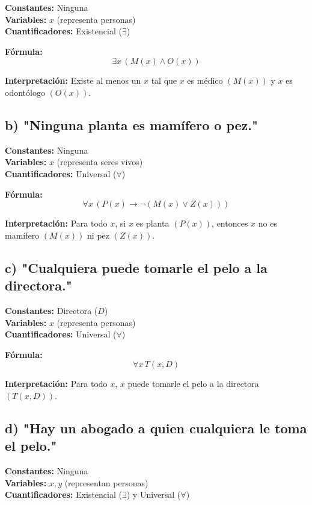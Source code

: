 \documentclass[11pt,letterpaper]{article}
\begin{document}
\textbf{Constantes:} Ninguna \\
\textbf{Variables:} \( x \) (representa personas) \\
\textbf{Cuantificadores:} Existencial (\( \exists \))

\textbf{Fórmula:}
\[
\exists x \, (M(x) \land O(x))
\]

\textbf{Interpretación:} Existe al menos un \( x \) tal que \( x \) es médico \( (M(x)) \) y \( x \) es odontólogo \( (O(x)) \).

\subsection*{b) "Ninguna planta es mamífero o pez."}

\textbf{Constantes:} Ninguna \\
\textbf{Variables:} \( x \) (representa seres vivos) \\
\textbf{Cuantificadores:} Universal (\( \forall \))

\textbf{Fórmula:}
\[
\forall x \, (P(x) \rightarrow \neg (M(x) \lor Z(x)))
\]

\textbf{Interpretación:} Para todo \( x \), si \( x \) es planta \( (P(x)) \), entonces \( x \) no es mamífero \( (M(x)) \) ni pez \( (Z(x)) \).

\subsection*{c) "Cualquiera puede tomarle el pelo a la directora."}

\textbf{Constantes:} Directora (\( D \)) \\
\textbf{Variables:} \( x \) (representa personas) \\
\textbf{Cuantificadores:} Universal (\( \forall \))

\textbf{Fórmula:}
\[
\forall x \, T(x, D)
\]

\textbf{Interpretación:} Para todo \( x \), \( x \) puede tomarle el pelo a la directora \( (T(x, D)) \).

\subsection*{d) "Hay un abogado a quien cualquiera le toma el pelo."}

\textbf{Constantes:} Ninguna \\
\textbf{Variables:} \( x, y \) (representan personas) \\
\textbf{Cuantificadores:} Existencial (\( \exists \)) y Universal (\( \forall \))
\end{document}
